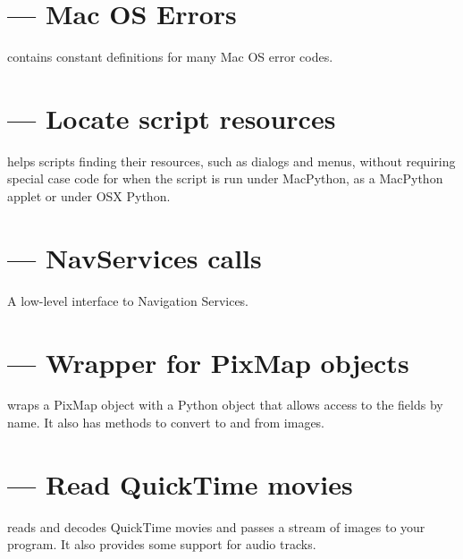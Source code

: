 \section{ --- Mac OS Errors}

 contains constant definitions for many Mac OS error
codes.


\section{ --- Locate script resources}

 helps scripts finding their resources, such as
dialogs and menus, without requiring special case code for when the
script is run under MacPython, as a MacPython applet or under OSX Python.

\section{ --- NavServices calls}

A low-level interface to Navigation Services. 

\section{ --- Wrapper for PixMap objects}

 wraps a PixMap object with a Python object that
allows access to the fields by name. It also has methods to convert
to and from  images.

\section{ --- Read QuickTime movies}

 reads and decodes QuickTime movies and passes
a stream of images to your program. It also provides some support for
audio tracks.

